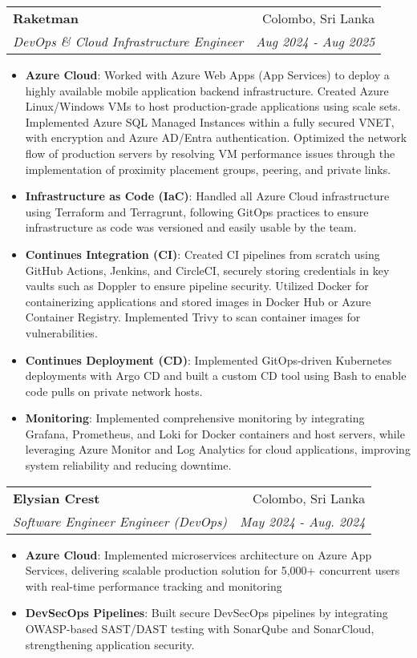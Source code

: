 \documentclass[letterpaper,11pt]{article}
\makeatletter
\newcommand{\resumeItem}[2]{
  \item\small{
    \textbf{#1}{: #2 \vspace{-2pt}}
  }
}
\newcommand{\resumeSubheading}[4]{
  \vspace{-1pt}\item
    \begin{tabular*}{0.97\textwidth}{l@{\extracolsep{\fill}}r}
      \textbf{#1} & #2 \\
      \textit{\small#3} & \textit{\small #4} \\
    \end{tabular*}\vspace{-5pt}
}
\newcommand{\resumeItemListStart}{\begin{itemize}}
\newcommand{\resumeItemListEnd}{\end{itemize}\vspace{-5pt}}
\makeatother
\begin{document}
    \resumeSubheading
      {Raketman}{Colombo, Sri Lanka}
      {DevOps \& Cloud Infrastructure Engineer}{Aug 2024 - Aug 2025}
      \resumeItemListStart
        \resumeItem{Azure Cloud}
          {Worked with Azure Web Apps (App Services) to deploy a highly available mobile application backend infrastructure. Created Azure Linux/Windows VMs to host production-grade applications using scale sets. Implemented Azure SQL Managed Instances within a fully secured VNET, with encryption and Azure AD/Entra authentication. Optimized the network flow of production servers by resolving VM performance issues through the implementation of proximity placement groups, peering, and private links. }
          \resumeItem{Infrastructure as Code (IaC)}
          {Handled all Azure Cloud infrastructure using Terraform and Terragrunt, following GitOps practices to ensure infrastructure as code was versioned and easily usable by the team. }
        \resumeItem{Continues Integration (CI)}
          {Created CI pipelines from scratch using GitHub Actions, Jenkins, and CircleCI, securely storing credentials in key vaults such as Doppler to ensure pipeline security. Utilized Docker for containerizing applications and stored images in Docker Hub or Azure Container Registry. Implemented Trivy to scan container images for vulnerabilities. }
          \resumeItem{Continues Deployment (CD)}
          {Implemented GitOps-driven Kubernetes deployments with Argo CD and built a custom CD tool using Bash to enable code pulls on private network hosts. }
          \resumeItem{Monitoring}
          {Implemented comprehensive monitoring by integrating Grafana, Prometheus, and Loki for Docker containers and host servers, while leveraging Azure Monitor and Log Analytics for cloud applications, improving system reliability and reducing downtime. }
      \resumeItemListEnd

    \resumeSubheading
      {Elysian Crest}{Colombo, Sri Lanka}
      {Software Engineer Engineer (DevOps) }{May 2024 - Aug. 2024}
      \resumeItemListStart
        \resumeItem{Azure Cloud}
          {Implemented microservices architecture on Azure App Services, delivering scalable production solution for 5,000+ concurrent users with real-time performance tracking and monitoring }
          \resumeItem{DevSecOps Pipelines}
          {Built secure DevSecOps pipelines by integrating OWASP-based SAST/DAST testing with SonarQube and SonarCloud, strengthening application security. }
      \resumeItemListEnd
\end{document}
